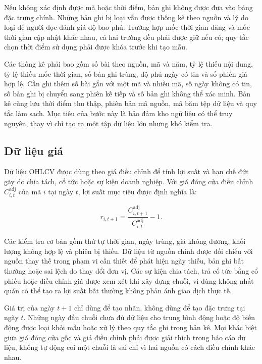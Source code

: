 Nếu không xác định được mã hoặc thời điểm, bản ghi không được đưa vào bảng đặc trưng
chính. Những bản ghi bị loại vẫn được thống kê theo nguồn và lý do loại để người đọc
đánh giá độ bao phủ. Trường hợp mốc thời gian đăng và mốc thời gian cập nhật khác nhau,
cả hai trường đều phải được giữ nếu có; quy tắc chọn thời điểm sử dụng phải được khóa
trước khi tạo mẫu.

Các thống kê phải bao gồm số bài theo nguồn, mã và năm, tỷ lệ thiếu nội dung, tỷ lệ
thiếu mốc thời gian, số bản ghi trùng, độ phủ ngày có tin và số phiên giá hợp lệ. Cần
ghi thêm số bài gắn với một mã và nhiều mã, số ngày không có tin, số bản ghi bị chuyển
sang phiên kế tiếp và số bản ghi không thể xác minh. Bản kê cũng lưu thời điểm thu
thập, phiên bản mã nguồn, mã băm tệp dữ liệu và quy tắc làm sạch. Mục tiêu của bước
này là bảo đảm kho ngữ liệu có thể truy nguyên, thay vì chỉ tạo ra một tập dữ liệu lớn
nhưng khó kiểm tra.

\subsection{Dữ liệu giá}

Dữ liệu OHLCV được dùng theo giá điều chỉnh để tính lợi suất và hạn chế đứt gãy do chia
tách, cổ tức hoặc sự kiện doanh nghiệp. Với giá đóng cửa điều chỉnh
$C^{\mathrm{adj}}_{i,t}$ của mã $i$ tại ngày $t$, lợi suất mục tiêu được định nghĩa là:

\begin{equation}
  r_{i,t+1}=\frac{C^{\mathrm{adj}}_{i,t+1}}
  {C^{\mathrm{adj}}_{i,t}}-1.
  \label{eq:next-return}
\end{equation}

Các kiểm tra cơ bản gồm thứ tự thời gian, ngày trùng, giá không dương, khối lượng
không hợp lệ và phiên bị thiếu. Dữ liệu từ nguồn chính được đối chiếu với nguồn thay
thế trong phạm vi cần thiết để phát hiện ngày thiếu, bản ghi bất thường hoặc sai lệch
do thay đổi đơn vị. Các sự kiện chia tách, trả cổ tức bằng cổ phiếu hoặc điều chỉnh giá
được xem xét khi xây dựng chuỗi, vì dùng không nhất quán có thể tạo ra lợi suất bất
thường không phản ánh giao dịch thực tế.

Giá trị của ngày $t+1$ chỉ dùng để tạo nhãn, không dùng để tạo đặc trưng tại ngày $t$.
Những ngày đầu chuỗi chưa đủ dữ liệu cho trung bình động hoặc độ biến động được loại khỏi
mẫu hoặc xử lý theo quy tắc ghi trong bản kê. Mọi khác biệt giữa giá đóng cửa gốc
và giá điều chỉnh phải được giải thích trong báo cáo dữ liệu, không tự động coi một
chuỗi là sai chỉ vì hai nguồn có cách điều chỉnh khác nhau.

